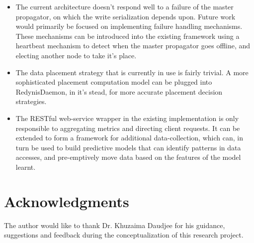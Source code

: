 \documentclass{sig-alternate}
\begin{document}
\begin{itemize}
	\item The current architecture doesn't respond well to a failure of the master propagator, on which the write serialization depends upon. Future work would primarily be focused on implementing failure handling mechanisms. These mechanisms can be introduced into the existing framework using a heartbeat mechanism to detect when the master propagator goes offline, and electing another node to take it's place.
	\item The data placement strategy that is currently in use is fairly trivial. A more sophisticated placement computation model can be plugged into RedynisDaemon, in it's stead, for more accurate placement decision strategies.
	\item The RESTful web-service wrapper in the existing implementation is only responsible to aggregating metrics and directing client requests. It can be extended to form a framework for additional data-collection, which can, in turn be used to build predictive models that can identify patterns in data accesses, and pre-emptively move data based on the features of the model learnt.\\
\end{itemize}


\section{Acknowledgments}
The author would like to thank Dr. Khuzaima Daudjee for his guidance, suggestions and feedback during the conceptualization of this research project.\\




\end{document}
